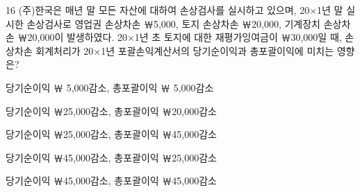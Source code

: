 \begin{question}{16}
(주)한국은 매년 말 모든 자산에 대하여 손상검사를 실시하고 있으며, 20×1년 말 실시한 손상검사로 영업권 손상차손 ￦5,000, 토지 손상차손 ￦20,000, 기계장치 손상차손 ￦20,000이 발생하였다. 20×1년 초 토지에 대한 재평가잉여금이 ￦30,000일 때, 손상차손 회계처리가 20×1년 포괄손익계산서의 당기순이익과 총포괄이익에 미치는 영향은?
\begin{choices}
  \item 당기순이익 ￦ 5,000감소, 총포괄이익 ￦ 5,000감소
  \item 당기순이익 ￦25,000감소, 총포괄이익 ￦20,000감소
  \item 당기순이익 ￦25,000감소, 총포괄이익 ￦45,000감소
  \item 당기순이익 ￦45,000감소, 총포괄이익 ￦25,000감소
  \item 당기순이익 ￦45,000감소, 총포괄이익 ￦45,000감소
\end{choices}
\end{question}
